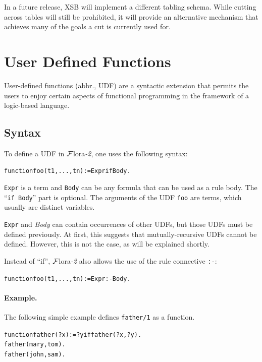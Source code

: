 \documentclass[11pt]{article}
\newcommand{\FLORA}{{\mbox{\sc ${\cal F}${lora}\rm\emph{-2}}}\xspace}
\begin{document}
In a future release, XSB will implement a different tabling schema. While
cutting across tables will still be prohibited, it will provide an
alternative mechanism that achieves many of the goals a cut is currently  used for.


\section{User Defined Functions} \label{sec:udf}


User-defined functions (abbr., UDF) are a syntactic extension that permits
the users to enjoy certain aspects of functional programming in the
framework of a logic-based language.
 

\subsection{Syntax}\label{sec-udf}
To define a UDF in
\FLORA, one uses the following syntax:

\begin{alltt}
    function foo(t1,...,tn) := Expr if Body.
\end{alltt}

\noindent
\texttt{Expr} is a term and \texttt{Body} can be any formula that can be
used as a rule body.
The ``\texttt{if Body}'' part is optional.
The arguments of the UDF \texttt{foo} are
terms, which usually are distinct variables.

\texttt{Expr} and \emph{Body} can contain occurrences of other UDFs, but those
UDFs must be defined previously. At first, this suggests that
mutually-recursive UDFs cannot be defined. However, this is not the case,
as will be explained shortly.

Instead of ``if'', \FLORA also allows the use of the rule connective
\texttt{:-}: 
\begin{alltt}
    function foo(t1,...,tn) := Expr :- Body.
\end{alltt}

\paragraph{Example.}
The following simple example defines \texttt{father/1} as a function.
\begin{alltt}
    function father(?x):=?y if father(?x,?y).
    father(mary,tom).
    father(john,sam).
\end{alltt}
\end{document}
